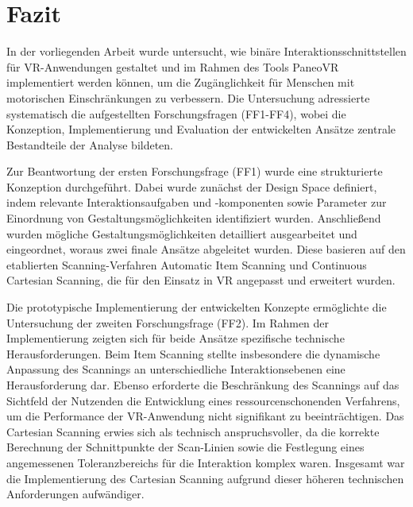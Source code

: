 \chapter{Fazit}
\label{chap:Zusammenfassung und Ausblick}

In der vorliegenden Arbeit wurde untersucht, wie binäre Interaktionsschnittstellen für VR-Anwendungen gestaltet und im Rahmen des Tools PaneoVR implementiert werden können, um die Zugänglichkeit für Menschen mit motorischen Einschränkungen zu verbessern. Die Untersuchung adressierte systematisch die aufgestellten Forschungsfragen (FF1-FF4), wobei die Konzeption, Implementierung und Evaluation der entwickelten Ansätze zentrale Bestandteile der Analyse bildeten.

Zur Beantwortung der ersten Forschungsfrage (FF1) wurde eine strukturierte Konzeption durchgeführt. Dabei wurde zunächst der Design Space definiert, indem relevante Interaktionsaufgaben und -komponenten sowie Parameter zur Einordnung von Gestaltungsmöglichkeiten identifiziert wurden. Anschließend wurden mögliche Gestaltungsmöglichkeiten detailliert ausgearbeitet und eingeordnet, woraus zwei finale Ansätze abgeleitet wurden. Diese basieren auf den etablierten Scanning-Verfahren Automatic Item Scanning und Continuous Cartesian Scanning, die für den Einsatz in VR angepasst und erweitert wurden.

Die prototypische Implementierung der entwickelten Konzepte ermöglichte die Untersuchung der zweiten Forschungsfrage (FF2). Im Rahmen der Implementierung zeigten sich für beide Ansätze spezifische technische Herausforderungen. Beim Item Scanning stellte insbesondere die dynamische Anpassung des Scannings an unterschiedliche Interaktionsebenen eine Herausforderung dar. Ebenso erforderte die Beschränkung des Scannings auf das Sichtfeld der Nutzenden die Entwicklung eines ressourcenschonenden Verfahrens, um die Performance der VR-Anwendung nicht signifikant zu beeinträchtigen. Das Cartesian Scanning erwies sich als technisch anspruchsvoller, da die korrekte Berechnung der Schnittpunkte der Scan-Linien sowie die Festlegung eines angemessenen Toleranzbereichs für die Interaktion komplex waren. Insgesamt war die Implementierung des Cartesian Scanning aufgrund dieser höheren technischen Anforderungen aufwändiger.

